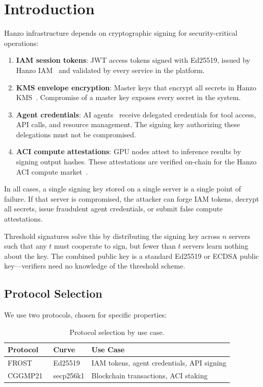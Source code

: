 \section{Introduction}

\label{sec:intro}

Hanzo infrastructure depends on cryptographic signing for security-critical
operations:
\begin{enumerate}[leftmargin=1.4em]
    \item \textbf{IAM session tokens}: JWT access tokens signed with Ed25519,
    issued by Hanzo IAM~\cite{hanzoiam} and validated by every service in the
    platform.
    \item \textbf{KMS envelope encryption}: Master keys that encrypt all
    secrets in Hanzo KMS~\cite{hanzokms}. Compromise of a master key exposes
    every secret in the system.
    \item \textbf{Agent credentials}: AI agents~\cite{hanzoagentsdk} receive
    delegated credentials for tool access, API calls, and resource management.
    The signing key authorizing these delegations must not be compromised.
    \item \textbf{ACI compute attestations}: GPU nodes attest to inference
    results by signing output hashes. These attestations are verified on-chain
    for the Hanzo ACI compute market~\cite{hanzoaci}.
\end{enumerate}

In all cases, a single signing key stored on a single server is a single point
of failure. If that server is compromised, the attacker can forge IAM tokens,
decrypt all secrets, issue fraudulent agent credentials, or submit false compute
attestations.

Threshold signatures solve this by distributing the signing key across $n$
servers such that any $t$ must cooperate to sign, but fewer than $t$ servers
learn nothing about the key. The combined public key is a standard Ed25519 or
ECDSA public key---verifiers need no knowledge of the threshold scheme.

\subsection{Protocol Selection}

We use two protocols, chosen for specific properties:

\begin{table}[H]
\centering
\small
\begin{tabular}{lll}
\toprule
\textbf{Protocol} & \textbf{Curve} & \textbf{Use Case} \\
\midrule
FROST~\cite{frost} & Ed25519 & IAM tokens, agent credentials, API signing \\
CGGMP21~\cite{cggmp21} & secp256k1 & Blockchain transactions, ACI staking \\
\bottomrule
\end{tabular}
\caption{Protocol selection by use case.}
\label{tab:protocols}
\end{table}

